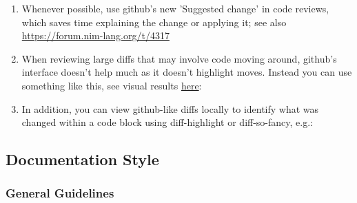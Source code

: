 \begin{enumerate}
\def\labelenumi{\arabic{enumi}.}
\item
  Whenever possible, use github's new 'Suggested change' in code
  reviews, which saves time explaining the change or applying it; see
  also \url{https://forum.nim-lang.org/t/4317}
\item
  When reviewing large diffs that may involve code moving around,
  github's interface doesn't help much as it doesn't highlight moves.
  Instead you can use something like this, see visual results
  \href{https://github.com/nim-lang/Nim/pull/10431\#issuecomment-456968196}{here}:

\begin{Shaded}
\begin{Highlighting}[]
\KeywordTok{\&\&} 
\end{Highlighting}
\end{Shaded}
\item
  In addition, you can view github-like diffs locally to identify what
  was changed within a code block using {diff-highlight} or
  {diff-so-fancy}, e.g.:

\begin{Shaded}
\begin{Highlighting}[]
\NormalTok{[}\NormalTok{]}
  \NormalTok{ = }\KeywordTok{\textasciigrave{}}\KeywordTok{\textasciigrave{}}
\end{Highlighting}
\end{Shaded}
\end{enumerate}

\hypertarget{documentation-style}{%
\subsection{Documentation Style}\label{documentation-style}}

\hypertarget{general-guidelines}{%
\subsubsection{General Guidelines}\label{general-guidelines}}

